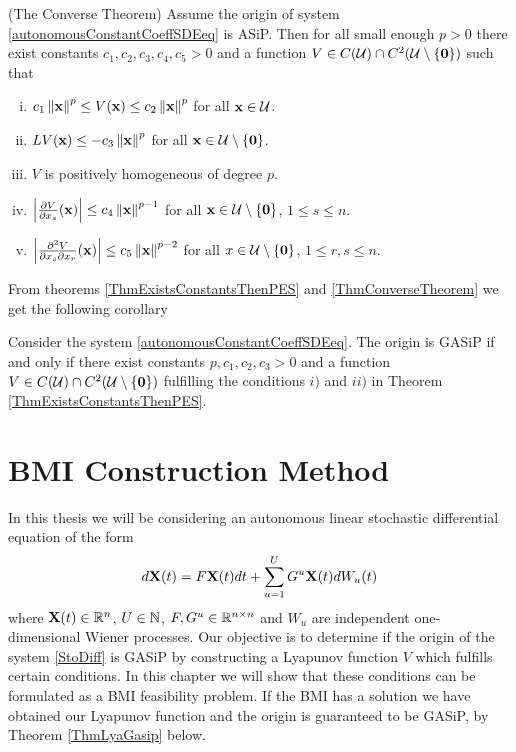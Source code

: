 \documentclass[a4paper,12pt,twoside,BCOR=10mm]{scrbook}
\begin{document}
\begin{theorem}(The Converse Theorem)\label{ThmConverseTheorem}
Assume the origin of system \eqref{autonomousConstantCoeffSDEeq} is ASiP. Then for all small enough $p > 0$ there exist constants $c_1,c_2,c_3,c_4,c_5 > 0$ and a function $V\in C(\mathcal{U})\cap C^2(\mathcal{U}\setminus \{\mathbf{0}\})$ such that
\begin{enumerate}[i)]
    \item $c_1\left\lVert\mathbf{x}\right\rVert_{}^{p} \leq V(\mathbf{x}) \leq c_2\left\lVert\mathbf{x}\right\rVert_{}^{p}$ for all $\mathbf{x} \in \mathcal{U}$.
    \item $LV(\mathbf{x}) \leq -c_3\left\lVert\mathbf{x}\right\rVert_{}^{p}$ for all $\mathbf{x} \in \mathcal{U}\setminus \{\mathbf{0}\}$.
    \item $V$ is positively homogeneous of degree $p$.
    \item $\left\lvert \frac{\partial V}{\partial x_s}(\mathbf{x})\right\rvert \leq c_4\left\lVert\mathbf{x}\right\rVert_{}^{p-1}$ for all $\mathbf{x}\in \mathcal{U}\setminus \{\mathbf{0}\}$, $1\leq s\leq n$.
    \item $\left\lvert \frac{\partial^2 V}{\partial x_s \partial x_r}(\mathbf{x})\right\rvert \leq c_5 \left\lVert\mathbf{x}\right\rVert_{}^{p - 2}$ for all $x\in\mathcal{U}\setminus \{\mathbf{0}\}$, $1\leq r,s\leq n$.
\end{enumerate}
\end{theorem}

From theorems \ref{ThmExistsConstantsThenPES} and \ref{ThmConverseTheorem} we get the following corollary

\begin{corollary}
Consider the system \eqref{autonomousConstantCoeffSDEeq}. The origin is GASiP if and only if there exist constants $p, c_1,c_2,c_3 > 0$ and a function $V\in C(\mathcal{U})\cap C^2(\mathcal{U}\setminus \{\mathbf{0}\})$ fulfilling the conditions $i)$ and $ii)$ in Theorem \ref{ThmExistsConstantsThenPES}.
\end{corollary}







\chapter{BMI Construction Method}\label{KafliBMIConstructionMethod}
In this thesis we will be considering an autonomous linear stochastic differential equation of the form
\begin{align}\label{StoDiff}
    d\mathbf{X}(t) = F\mathbf{X}(t)dt  + \sum_{u = 1}^UG^u\mathbf{X}(t) dW_u(t)
\end{align}
where $\mathbf{X}(t)\in\mathbb{R}^{n}$, $U\in\mathbb{N}$, $F, G^u\in \mathbb{R}^{n\times n}$ and $W_u$ are independent one-dimensional Wiener processes. Our objective is to determine if the origin of the system \eqref{StoDiff} is GASiP by constructing a Lyapunov function $V$ which fulfills certain conditions. In this chapter we will show that these conditions can be formulated as a BMI feasibility problem. If the BMI has a solution we have obtained our Lyapunov function and the origin is guaranteed to be GASiP, by Theorem \ref{ThmLyaGasip} below.
\end{document}
